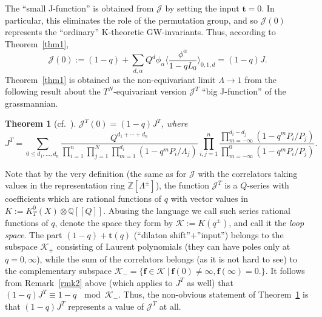 \documentclass[pdftex]{sigma}
\numberwithin{equation}{section}
\newtheorem{Theorem}{Theorem}[section]
\def\K{\mathcal K}
\def\J{\mathcal J}
\def\QQ{\mathbb Q}
\def\ZZ{\mathbb Z}
\def\a{\alpha}
\def\f{{\mathbf f}}
\def\t{{\mathbf t}}
\def\lan{\langle}
\def\ran{\rangle}
\begin{document}
The ``small J-function'' is obtained from $\J$ by setting the input $\t=0$. In particular, this eliminates the role of the permutation group, and so $\J(0)$ represents the ``ordinary'' K-theoretic GW-invariants. Thus, according to Theorem~\ref{thm1},
\[
\J(0):=(1-q)+\sum_{d,\a}Q^d\phi_\a\bigg\lan\frac{\phi^\a}{1-qL_0}\bigg\ran_{0,1,d}=(1-q) J.
\]
Theorem~\ref{thm1} is obtained as the non-equivariant limit $\Lambda\to 1$ from the following result about the $T^N$-equivariant version $\J^T$ ``big J-function'' of the grassmannian.

\begin{Theorem}[{cf.~\cite{Taipale, Wen}}]\label{thm2}
$\J^T(0)=(1-q)J^T$, where
\[
J^T=\sum_{0\leq d_1,\dots,d_n}\frac{Q^{d_1+\cdots+d_n}}{\prod_{i=1}^n\prod_{j=1}^N\prod_{m=1}^{d_i}(1-q^mP_i/\Lambda_j)} \prod_{i,j=1}^n\frac{\prod_{m=-\infty}^{d_i-d_j}(1-q^mP_i/P_j)} {\prod_{m=-\infty}^0(1-q^mP_i/P_j)}.
\]
\end{Theorem}

Note that by the very definition (the same as for $\J$ with the correlators taking values in the representation ring $\ZZ[\Lambda^{\pm}]$), the function $\J^T$ is a $Q$-series with coefficients which are rational functions of $q$ with vector values in $K:=K^0_T(X)\otimes \QQ[[Q]]$. Abusing the language we call such series rational functions of $q$, denote the space they form by $\K:=K(q^{\pm})$, and
call it the {\em loop space}. The part $(1-q)+\t(q)$ (``dilaton shift''$+$''input'') belongs to the subspace $\K_{+}$ consisting of Laurent polynomials (they can have poles only at $q=0,\infty$), while the sum of the correlators belongs (as it is not hard to see) to the complementary subspace $\K_{-}=\{ \f \in \K\ | \ \f(0)\neq \infty, \f(\infty)=0.\}$. It follows from Remark~\ref{rmk2} above (which applies to $J^T$ as well) that $(1-q)J^T\equiv 1-q\ \mod \K_{-}$. Thus, the non-obvious statement of Theorem~\ref{thm2} is that $(1-q)J^T$ represents a value of $\J^T$ at all.
\end{document}
